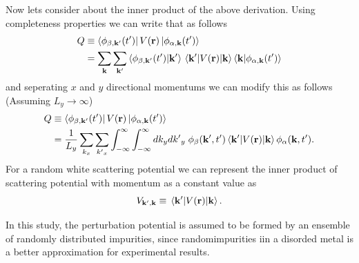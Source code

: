 \noindent
Now lets consider about the inner product of the above derivation. Using completeness properties we can write that as follows
\begin{equation} \label{4.23}
  \begin{aligned}
    Q & \equiv
    \bra{\phi_{\beta,\mathbf{k'}}(t')}
    V(\mathbf{r}) \ket{\phi_{\alpha,\mathbf{k}}(t')} \\
    & =
    \sum_{\mathbf{k}}\sum_{\mathbf{k'}}
    \braket{\phi_{\beta,\mathbf{k'}}(t')}{\mathbf{k'}}
    \mel{\mathbf{k'}}{V(\mathbf{r})}{\mathbf{k}}
    \braket{\mathbf{k}}{\phi_{\alpha,\mathbf{k}}(t')}
  \end{aligned}
\end{equation}
and seperating $x$ and $y$ directional momentums we can modify this as follows (Assuming $L_y \rightarrow \infty$)
\begin{equation} \label{4.24}
  \begin{aligned}
    Q & \equiv
    \bra{\phi_{\beta,\mathbf{k'}}(t')}
    V(\mathbf{r}) \ket{\phi_{\alpha,\mathbf{k}}(t')} \\
    & =
    \frac{1}{L_y}
    \sum_{k_x}\sum_{{k'}_x}
    \int_{-\infty}^{\infty} \int_{-\infty}^{\infty} dk_y d{k'}_y \;
    \phi_{\beta}(\mathbf{k'},t')
    \mel{\mathbf{k'}}{V(\mathbf{r})}{\mathbf{k}}
    \phi_{\alpha}(\mathbf{k},t').
  \end{aligned}
\end{equation}
For a random white scattering potential we can represent the inner product of scattering potential with momentum as a constant value as
\begin{equation} \label{4.25}
  V_{\mathbf{k'},\mathbf{k}} \equiv \mel{\mathbf{k'}}{V(\mathbf{r})}{\mathbf{k}}.
\end{equation}

\noindent
In this study, the perturbation potential is assumed to be formed by an ensemble of randomly distributed impurities, since randomimpurities iin a disorded metal is a better approximation for experimental results.

